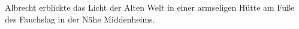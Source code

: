 
Albrecht erblickte das Licht der Alten Welt in einer armseligen Hütte am Fuße des Fauchslag in der Nähe Middenheims.
